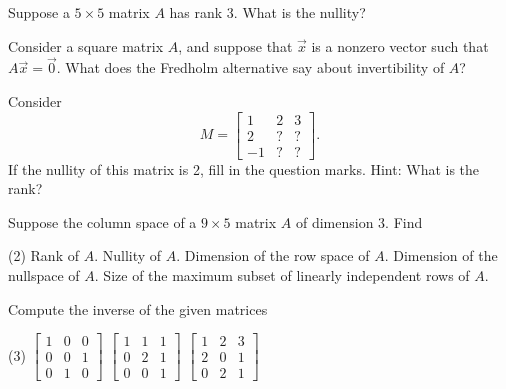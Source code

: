 \begin{exercise}
Suppose a $5 \times 5$ matrix $A$ has rank 3.  What is the nullity?
\end{exercise}

\begin{exercise}
Consider a square matrix $A$, and suppose that $\vec{x}$ is a nonzero
vector such that $A \vec{x} = \vec{0}$.  What does the Fredholm alternative
say about invertibility of $A$?
\end{exercise}

\begin{exercise}
Consider
\begin{equation*}
M =
\begin{bmatrix}
1 & 2 & 3 \\
2 & ? & ? \\
-1 & ? & ?
\end{bmatrix} .
\end{equation*}
If the nullity of this matrix is 2, fill in the question marks.  Hint: What
is the rank?
\end{exercise}

\begin{exercise}\ansMark%
Suppose the column space of a $9 \times 5$ matrix $A$ of dimension 3.  Find
\begin{tasks}(2)
\task
Rank of $A$.
\task
Nullity of $A$.
\task
Dimension of the row space of $A$.
\task
Dimension of the nullspace of $A$.
\task
Size of the maximum subset of
linearly independent rows of $A$.
\end{tasks}
\end{exercise}

\begin{exercise}
Compute the inverse of the given matrices
\begin{tasks}(3)
\task
$\begin{bmatrix}
1 & 0 & 0 \\
0 & 0 & 1 \\
0 & 1 & 0
\end{bmatrix}$
\task
$\begin{bmatrix}
1 & 1 & 1 \\
0 & 2 & 1 \\
0 & 0 & 1
\end{bmatrix}$
\task
$\begin{bmatrix}
1 & 2 & 3 \\
2 & 0 & 1 \\
0 & 2 & 1
\end{bmatrix}$
\end{tasks}
\end{exercise}


